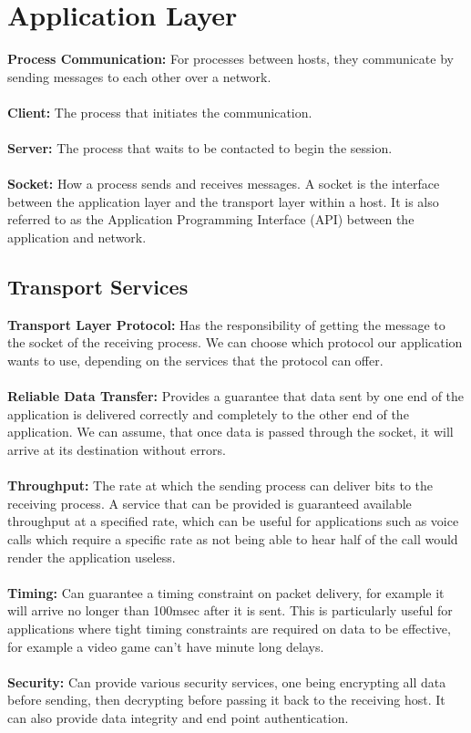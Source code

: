 \documentclass[]{article}
\begin{document}
\section{Application Layer}
\textcolor{Emerald}{\textbf{Process Communication:}} For processes between hosts, they communicate by sending messages to each other over a network. \\\\
\textcolor{Emerald}{\textbf{Client:}} The process that initiates the communication. \\\\
\textcolor{Emerald}{\textbf{Server:}} The process that waits to be contacted to begin the session. \\\\
\textcolor{Emerald}{\textbf{Socket:}} How a process sends and receives messages. A socket is the interface between the application layer and the transport layer within a host. It is also referred to as the Application Programming Interface (API) between the application and network. 
\subsection{Transport Services}
\textcolor{Emerald}{\textbf{Transport Layer Protocol:}} Has the responsibility of getting the message to the socket of the receiving process. We can choose which protocol our application wants to use, depending on the services that the protocol can offer. \\\\
\textcolor{Emerald}{\textbf{Reliable Data Transfer:}} Provides a guarantee that data sent by one end of the application is delivered correctly and completely to the other end of the application. We can assume, that once data is passed through the socket, it will arrive at its destination without errors. \\\\
\textcolor{Emerald}{\textbf{Throughput:}} The rate at which the sending process can deliver bits to the receiving process. A service that can be provided is guaranteed available throughput at a specified rate, which can be useful for applications such as voice calls which require a specific rate as not being able to hear half of the call would render the application useless. \\\\
\textcolor{Emerald}{\textbf{Timing:}} Can guarantee a timing constraint on packet delivery, for example it will arrive no longer than 100msec after it is sent. This is particularly useful for applications where tight timing constraints are required on data to be effective, for example a video game can't have minute long delays. \\\\
\textcolor{Emerald}{\textbf{Security:}} Can provide various security services, one being encrypting all data before sending, then decrypting before passing it back to the receiving host. It can also provide data integrity and end point authentication. 
\end{document}

